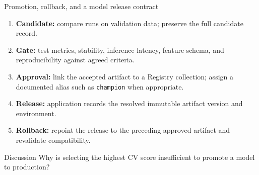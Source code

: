 \begin{frame}{Promotion, rollback, and a model release contract}
\begin{enumerate}\footnotesize
\item \textbf{Candidate:} compare runs on validation data; preserve the full candidate record.
\item \textbf{Gate:} test metrics, stability, inference latency, feature schema, and reproducibility against agreed criteria.
\item \textbf{Approval:} link the accepted artifact to a Registry collection; assign a documented alias such as \texttt{champion} when appropriate.
\item \textbf{Release:} application records the resolved immutable artifact version and environment.
\item \textbf{Rollback:} repoint the release to the preceding approved artifact and revalidate compatibility.
\end{enumerate}
\begin{block}{Discussion}
\footnotesize Why is selecting the highest CV score insufficient to promote a model to production?
\end{block}
\coursefooter
\end{frame}


